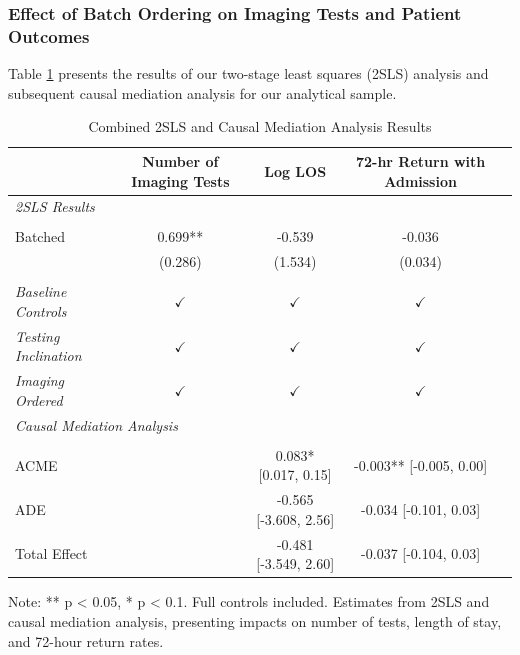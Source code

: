 \documentclass{article}
\begin{document}
\hypertarget{effect-of-batch-ordering-on-imaging-tests-and-patient-outcomes}{%
\subsubsection{Effect of Batch Ordering on Imaging Tests and Patient
Outcomes}\label{effect-of-batch-ordering-on-imaging-tests-and-patient-outcomes}}

Table \ref{tab:combined_results} presents the results of our two-stage
least squares (2SLS) analysis and subsequent causal mediation analysis
for our analytical sample.

\begin{table}[!htbp]
\centering
\caption{Combined 2SLS and Causal Mediation Analysis Results}
\label{tab:combined_results}
\begin{threeparttable}
\begin{tabularx}{\textwidth}{Xcccc}
\toprule
& Number of Imaging Tests & Log LOS & 72-hr Return with Admission \\ \cmidrule(l){2-2} \cmidrule(l){3-3} \cmidrule(l){4-5}
\midrule
\multicolumn{5}{l}{\textit{2SLS Results}} \\
\\
Batched & 0.699** & -0.539 & -0.036 & \\
& (0.286) & (1.534) & (0.034) & \\
\\
  \textit{Baseline Controls} &  $\checkmark$ & $\checkmark$ & $\checkmark$ \\ 
  \textit{Testing Inclination} &  $\checkmark$ & $\checkmark$ & $\checkmark$ \\ 
  \textit{Imaging Ordered} & $\checkmark$ & $\checkmark$ & $\checkmark$ \\ 
\midrule
\multicolumn{5}{l}{\textit{Causal Mediation Analysis}} \\
\\
ACME & & 0.083*  [0.017, 0.15] & -0.003**  [-0.005, 0.00] \\
ADE &  & -0.565  [-3.608, 2.56] & -0.034  [-0.101, 0.03] \\
Total Effect &  & -0.481  [-3.549, 2.60] & -0.037  [-0.104, 0.03] \\
\bottomrule
\end{tabularx}
\begin{tablenotes}
\small
\item Note: ** p < 0.05, * p < 0.1. Full controls included. Estimates from 2SLS and causal mediation analysis, presenting impacts on number of tests, length of stay, and 72-hour return rates.
\end{tablenotes}
\end{threeparttable}
\end{table}
\end{document}
